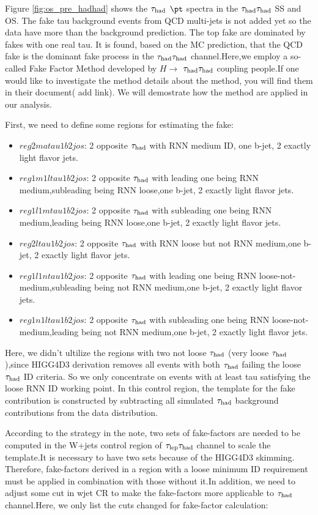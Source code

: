 Figure \ref{fig:os_pre_hadhad} shows the $\tau_\text{had}$ $\pt$ spectra in the $\tau_\text{had}{}\tau_\text{had}$ SS and OS. The fake tau background events from QCD multi-jets 
is not added yet so the data have more than the background prediction. The top fake are dominated by fakes with one real tau.
It is found, based on the MC prediction, that the QCD fake is the dominant fake process in the $\tau_\text{had}{}\tau_\text{had}$ channel.Here,we employ a so-called Fake Factor Method developed by  $H\rightarrow$ $\tau_\text{had}{}\tau_\text{had}$ coupling people.If one would like to  investigate the method details about the method,  you will find them in their document( add link). We will demostrate how the method are applied in our analysis.

First, we need to define some regions for estimating the fake:

\begin{itemize}
\item{$reg2matau1b2jos$:   2 opposite $\tau_\text{had}$  with RNN medium ID, one b-jet, 2 exactly light flavor jets.}
\item{$reg1m1ltau1b2jos$:  2 opposite $\tau_\text{had}$  with leading one being RNN medium,subleading being  RNN loose,one b-jet, 2 exactly light flavor jets.}
\item{$reg1l1mtau1b2jos$:  2 opposite $\tau_\text{had}$  with subleading one being RNN medium,leading being  RNN loose,one b-jet, 2 exactly light flavor jets.}
\item{$reg2ltau1b2jos$:    2 opposite $\tau_\text{had}$  with RNN loose but not RNN medium,one b-jet, 2 exactly light flavor jets.}
\item{$reg1l1ntau1b2jos$:  2 opposite $\tau_\text{had}$  with leading one being RNN loose-not-medium,subleading being not RNN medium,one b-jet, 2 exactly light flavor jets.}
\item{$reg1n1ltau1b2jos$:  2 opposite $\tau_\text{had}$  with subleading one being RNN loose-not-medium,leading being not RNN medium,one b-jet, 2 exactly light flavor jets.}
\end{itemize}

Here, we didn't ultilize the regions with two not loose $\tau_\text{had}$ (very loose $\tau_\text{had}$ ),since HIGG4D3 derivation removes all events with both $\tau_\text{had}$ failing the loose $\tau_\text{had}$ ID criteria. So we only concentrate on events with at least tau satisfying the loose RNN ID working point. In this control region, the template for the fake contribution is constructed by subtracting all simulated $\tau_\text{had}$ background contributions from the data distribution.

According to the strategy in the note, two sets of fake-factors are needed to be computed in the W+jets control region of $\tau_\text{lep}{}\tau_\text{had}$ channel to scale the template.It is necessary to have two sets because of the HIGG4D3 skimming. Therefore, fake-factors derived in a region with a loose minimum ID requirement must be applied in combination with those without it.In addition, we need to adjust some cut in wjet CR to make the fake-factors more applicable to $\tau_\text{had}$ channel.Here, we only list the cuts changed for fake-factor calculation:


